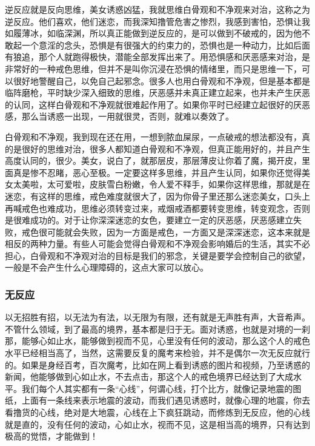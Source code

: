 逆反应就是反向思维，美女诱惑凶猛，我就思维白骨观和不净观来对治，这称之为逆反应。他们喜欢，他们迷恋，而我深知撸管危害之惨烈，我感到害怕，恐惧让我如履薄冰，如临深渊，所以真正能做到逆反应的，是可以做到不破戒的，因为他不敢起一个意淫的念头，恐惧是有很强大的约束力的，恐惧也是一种动力，比如后面有狼追，那个人就跑得极快，潜能全部发挥出来了。用恐惧感和厌恶感来对治，是非常好的一种戒色思维，但并不是叫你沉浸在恐惧的情绪里，而只是思维一下，可以很好地警醒自己，以免自己起邪念。很多人也用白骨观和不净观，但是基本都是临阵磨枪，平时缺少深入细致的思维，厌恶感并未真正建立起来，也并未产生厌恶的认同，这样白骨观和不净观就很难起作用了。如果你平时已经建立起很好的厌恶感，那么当诱惑一出现，一用就很灵，否则，就难以奏效了。

白骨观和不净观，我到现在还在用，一想到脓血屎尿，一点破戒的想法都没有，真的是很好的思维对治，很多人都知道白骨观和不净观，但真正能用好的，并且产生高度认同的，很少。美女，说白了，就那层皮，那层薄皮让你着了魔，揭开皮，里面真是惨不忍睹，恶心至极。一定要这样多思维，并且产生认同，如果你还觉得美女太美啦，太可爱啦，皮肤雪白粉嫩，令人爱不释手，如果你这样思维，那就是在迷恋，有这样的思维，戒色难度就很大了，因为你骨子里还那么迷恋美女，口头上再喊戒色也难成功，思维必须转变过来，戒烟戒酒都要转变思维，转变观念，否则是很难成功的。对于让你深深迷恋的女色，要建立一定的厌恶感，厌恶感建立失败，戒色很可能就会失败，因为一方面是戒色，一方面又是深深迷恋，这本来就是相反的两种力量。有些人可能会觉得白骨观和不净观会影响婚后的生活，其实不必担心，白骨观和不净观对治的目标是我们的邪念，关键是要学会控制自己的欲望，一般是不会产生什么心理障碍的，这点大家可以放心。

\subsubsection{无反应}

以无招胜有招，以无法为有法，以无限为有限，还有就是无声胜有声，大音希声。不管什么领域，到了最高的境界，基本都是归于无。面对诱惑，也就是对境的一刹那，能够心如止水，能够做到视而不见，心里没有任何的波动，那么这个人的戒色水平已经相当高了，当然，这需要反复的魔考来检验，并不是偶尔一次无反应就行的。如果是身经百考，百次魔考，比如在网上看到诱惑的图片和视频，乃至诱惑的新闻，他能够做到心如止水，不去点击，那这个人的戒色境界已经达到了大成水平。我们每个人其实都有一条“心线”，何谓心线，打个比方，就像记录地震的图纸，上面有一条线来表示地震的波动，而我们遇见诱惑时，就像心理的地震，你去看撸货的心线，绝对是大地震，心线在上下疯狂跳动，而修炼到无反应，他的心线就是直的，没有任何的波动，心如止水，视而不见，这是相当高的境界，只有达到极高的觉悟，才能做到！

